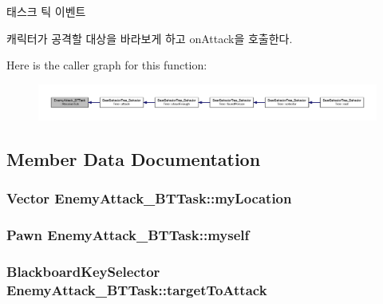 태스크 틱 이벤트 

캐릭터가 공격할 대상을 바라보게 하고 on\+Attack을 호출한다. 

Here is the caller graph for this function\+:\nopagebreak
\begin{figure}[H]
\begin{center}
\leavevmode
\includegraphics[width=350pt]{class_enemy_attack___b_t_task_ace9bb26b7392400fac4a24c736b16116_icgraph}
\end{center}
\end{figure}




\subsection{Member Data Documentation}
\subsubsection[{\texorpdfstring{my\+Location}{myLocation}}]{\setlength{\rightskip}{0pt plus 5cm}Vector Enemy\+Attack\+\_\+\+B\+T\+Task\+::my\+Location\hspace{0.3cm}{\ttfamily [private]}}\hypertarget{class_enemy_attack___b_t_task_ab57521e6c6d827822ff6be4f5947e912}{}\label{class_enemy_attack___b_t_task_ab57521e6c6d827822ff6be4f5947e912}
\subsubsection[{\texorpdfstring{myself}{myself}}]{\setlength{\rightskip}{0pt plus 5cm}Pawn Enemy\+Attack\+\_\+\+B\+T\+Task\+::myself\hspace{0.3cm}{\ttfamily [private]}}\hypertarget{class_enemy_attack___b_t_task_a547169bbc795a0fc6e6e12601c40cc47}{}\label{class_enemy_attack___b_t_task_a547169bbc795a0fc6e6e12601c40cc47}
\subsubsection[{\texorpdfstring{target\+To\+Attack}{targetToAttack}}]{\setlength{\rightskip}{0pt plus 5cm}Blackboard\+Key\+Selector Enemy\+Attack\+\_\+\+B\+T\+Task\+::target\+To\+Attack}\hypertarget{class_enemy_attack___b_t_task_a3e66ecf42db2caaa36b45cc0b6116062}{}\label{class_enemy_attack___b_t_task_a3e66ecf42db2caaa36b45cc0b6116062}
